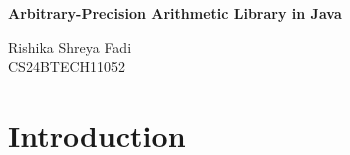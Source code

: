 \documentclass[12pt]{article}
\begin{document}
\begin{titlepage}
    \centering
    \vspace*{6cm}
    {\Huge\bfseries Arbitrary-Precision Arithmetic Library in Java\par}
    \vspace*{20mm}
    \vfill
    {\large Rishika Shreya Fadi \\ CS24BTECH11052\par}
\end{titlepage}

\setcounter{page}{1}
\pagestyle{plain}

\tableofcontents
\newpage

\section{Introduction}
\end{document}
